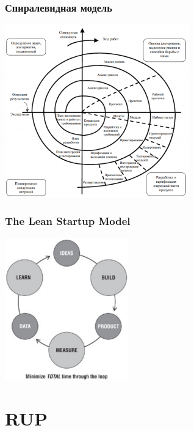 \documentclass{../../slides-style}
\begin{document}
    \begin{frame}
        \frametitle{Спиралевидная модель}
        \begin{center}
            \includegraphics[width=0.6\textwidth]{spiralModel.png}
        \end{center}
    \end{frame}

    \begin{frame}
        \frametitle{The Lean Startup Model}
        \begin{center}
            \includegraphics[width=0.4\textwidth]{theLeanStartupModel.png}
        \end{center}
    \end{frame}

    \section{RUP}
\end{document}
